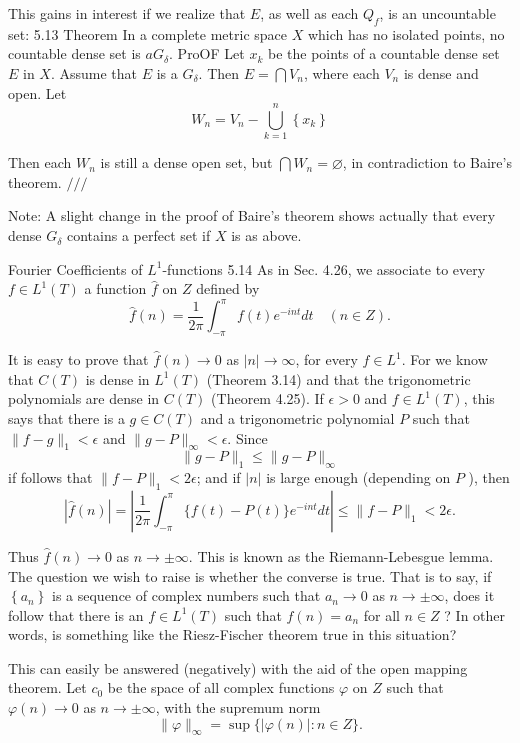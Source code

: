 This gains in interest if we realize that $E$, as well as each $Q_f$, is an uncountable set:
5.13 Theorem In a complete metric space $X$ which has no isolated points, no countable dense set is $a G_\delta$.
ProOF Let $x_k$ be the points of a countable dense set $E$ in $X$. Assume that $E$ is a $G_\delta$. Then $E=\bigcap V_n$, where each $V_n$ is dense and open. Let
$$
W_n=V_n-\bigcup_{k=1}^n\left\{x_k\right\}
$$

Then each $W_n$ is still a dense open set, but $\bigcap W_n=\varnothing$, in contradiction to Baire's theorem.
$/ / /$

Note: A slight change in the proof of Baire's theorem shows actually that every dense $G_\delta$ contains a perfect set if $X$ is as above.

Fourier Coefficients of $L^1$-functions
5.14 As in Sec. 4.26, we associate to every $f \in L^1(T)$ a function $\hat{f}$ on $Z$ defined by
$$
\hat{f}(n)=\frac{1}{2 \pi} \int_{-\pi}^\pi f(t) e^{-i n t} d t \quad(n \in Z) .
$$

It is easy to prove that $\hat{f}(n) \rightarrow 0$ as $|n| \rightarrow \infty$, for every $f \in L^1$. For we know that $C(T)$ is dense in $L^1(T)$ (Theorem 3.14) and that the trigonometric polynomials are dense in $C(T)$ (Theorem 4.25). If $\epsilon>0$ and $f \in L^1(T)$, this says that there is a $g \in C(T)$ and a trigonometric polynomial $P$ such that $\|f-g\|_1<\epsilon$ and $\|g-P\|_{\infty}<\epsilon$. Since
$$
\|g-P\|_1 \leq\|g-P\|_{\infty}
$$
if follows that $\|f-P\|_1<2 \epsilon$; and if $|n|$ is large enough (depending on $P$ ), then
$$
|\hat{f}(n)|=\left|\frac{1}{2 \pi} \int_{-\pi}^\pi\{f(t)-P(t)\} e^{-i n t} d t\right| \leq\|f-P\|_1<2 \epsilon .
$$

Thus $\hat{f}(n) \rightarrow 0$ as $n \rightarrow \pm \infty$. This is known as the Riemann-Lebesgue lemma.
The question we wish to raise is whether the converse is true. That is to say, if $\left\{a_n\right\}$ is a sequence of complex numbers such that $a_n \rightarrow 0$ as $n \rightarrow \pm \infty$, does it follow that there is an $f \in L^1(T)$ such that $\hat{f}(n)=a_n$ for all $n \in Z$ ? In other words, is something like the Riesz-Fischer theorem true in this situation?

This can easily be answered (negatively) with the aid of the open mapping theorem.
Let $c_0$ be the space of all complex functions $\varphi$ on $Z$ such that $\varphi(n) \rightarrow 0$ as $n \rightarrow \pm \infty$, with the supremum norm
$$
\|\varphi\|_{\infty}=\sup \{|\varphi(n)|: n \in Z\} .
$$


